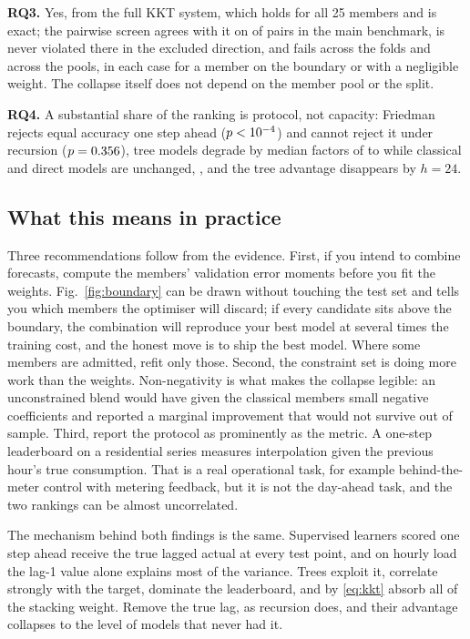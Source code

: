 \documentclass[journal]{IEEEtran}
\begin{document}
\textbf{RQ3.} Yes, from the full KKT system, which holds for all 25 members and is exact; the pairwise screen agrees with it on \nAgree{} of \nNonLeading{} pairs in the main benchmark, is never violated there in the excluded direction, and fails \foldViolTimes{} across the folds and \sensViolTimes{} across the pools, in each case for a member on the boundary or with a negligible weight. The collapse itself does not depend on the member pool or the split.

\textbf{RQ4.} A substantial share of the ranking is protocol, not capacity: Friedman rejects equal accuracy one step ahead ($p < 10^{-4}$) and cannot reject it under recursion ($p = 0.356$), tree models degrade by median factors of \treeDegMin{} to \treeDegMax{} while classical and direct models are unchanged, \tauOPSDHClause, and the tree advantage disappears by $h = 24$.

\subsection{What this means in practice}
Three recommendations follow from the evidence. First, if you intend to combine forecasts, compute the members' validation error moments before you fit the weights. Fig.~\ref{fig:boundary} can be drawn without touching the test set and tells you which members the optimiser will discard; if every candidate sits above the boundary, the combination will reproduce your best model at several times the training cost, and the honest move is to ship the best model. Where some members are admitted, refit only those. Second, the constraint set is doing more work than the weights. Non-negativity is what makes the collapse legible: an unconstrained blend would have given the classical members small negative coefficients and reported a marginal improvement that would not survive out of sample. Third, report the protocol as prominently as the metric. A one-step leaderboard on a residential series measures interpolation given the previous hour's true consumption. That is a real operational task, for example behind-the-meter control with metering feedback, but it is not the day-ahead task, and the two rankings can be almost uncorrelated.

The mechanism behind both findings is the same. Supervised learners scored one step ahead receive the true lagged actual at every test point, and on hourly load the lag-1 value alone explains most of the variance. Trees exploit it, correlate strongly with the target, dominate the leaderboard, and by \eqref{eq:kkt} absorb all of the stacking weight. Remove the true lag, as recursion does, and their advantage collapses to the level of models that never had it.
\end{document}
